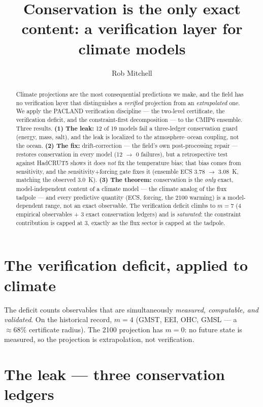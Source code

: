 \documentclass[11pt]{article}
\title{Conservation is the only exact content: a verification layer for climate models}
\author{Rob Mitchell}
\date{}
\begin{document}
\maketitle

\begin{abstract}
Climate projections are the most consequential predictions we make, and the
field has no verification layer that distinguishes a \emph{verified} projection
from an \emph{extrapolated} one. We apply the PACLAND verification discipline ---
the two-level certificate, the verification deficit, and the constraint-first
decomposition --- to the CMIP6 ensemble. Three results. \textbf{(1) The leak:}
12 of 19 models fail a three-ledger conservation guard (energy, mass, salt), and
the leak is localized to the atmosphere--ocean coupling, not the ocean.
\textbf{(2) The fix:} drift-correction --- the field's own post-processing repair
--- restores conservation in every model (12 $\to$ 0 failures), but a
retrospective test against HadCRUT5 shows it does \emph{not} fix the temperature
bias; that bias comes from sensitivity, and the sensitivity+forcing gate fixes it
(ensemble ECS 3.78 $\to$ 3.08~K, matching the observed 3.0~K). \textbf{(3) The
theorem:} conservation is the \emph{only} exact, model-independent content of a
climate model --- the climate analog of the flux tadpole --- and every predictive
quantity (ECS, forcing, the 2100 warming) is a model-dependent range, not an exact
observable. The verification deficit climbs to $m = 7$ (4 empirical observables +
3 exact conservation ledgers) and is \emph{saturated}: the constraint contribution
is capped at 3, exactly as the flux sector is capped at the tadpole.
\end{abstract}

\section{The verification deficit, applied to climate}

The deficit counts observables that are simultaneously \emph{measured, computable,
and validated}. On the historical record, $m = 4$ (GMST, EEI, OHC, GMSL --- a
$\approx 68\%$ certificate radius). The 2100 projection has $m = 0$: no future
state is measured, so the projection is extrapolation, not verification.

\section{The leak --- three conservation ledgers}
\end{document}
